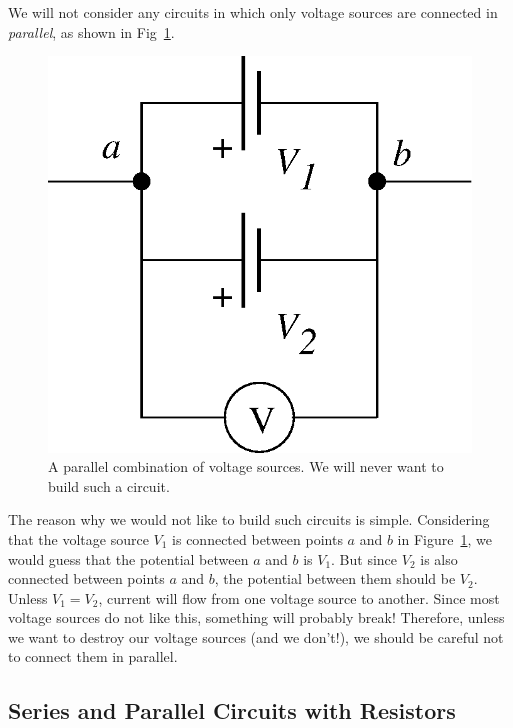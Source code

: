 We will not consider any circuits in which only voltage sources are connected 
in {\it parallel}, as shown in Fig~\ref{fig:DC:voltparallel}. 
\begin{figure}[htb]
\centering \epsfxsize=4cm \includegraphics[scale=0.6]{2_dc/voltparallel.eps}
\caption{A parallel combination of voltage sources. We will never want to build
such a circuit.}
\label{fig:DC:voltparallel}
\end{figure}
The reason why we would not like to build such circuits is simple. Considering 
that the voltage source $V_1$ is connected between points $a$ and $b$ in 
Figure~\ref{fig:DC:voltparallel}, we would guess that the potential between $a$
and $b$ is $V_1$.  But since $V_2$ is also connected between points $a$ and 
$b$, the potential between them should be $V_2$.  Unless $V_1=V_2$, current 
will flow from one voltage source to another. Since most voltage sources do 
not like this, something will probably break!  Therefore, unless we want to 
destroy our voltage sources (and we don't!), we should be careful not to 
connect them in parallel.

\subsection{Series and Parallel Circuits with Resistors}

